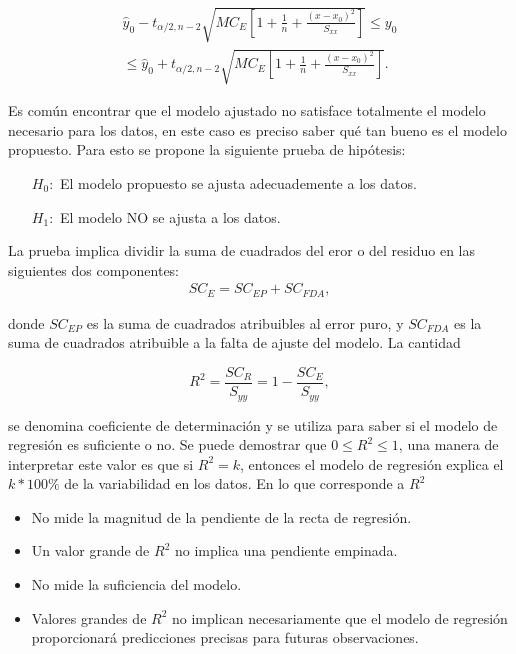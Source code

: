 \documentclass[12pt]{article}
\begin{document}
\begin{eqnarray*}
\hat{y}_{0}-t_{\alpha/2,n-2}\sqrt{MC_{E}\left[1+\frac{1}{n}+\frac{\left(x-x_{0}\right)^2}{S_{xx}}\right]}\leq y_{0}\\
\leq \hat{y}_{0}+t_{\alpha/2,n-2}\sqrt{MC_{E}\left[1+\frac{1}{n}+\frac{\left(x-x_{0}\right)^2}{S_{xx}}\right]}.
\end{eqnarray*}

Es com\'un encontrar que el modelo ajustado no satisface totalmente el modelo necesario para los datos, en este caso es preciso saber qu\'e tan bueno es el modelo propuesto. Para esto se propone la siguiente prueba de hip\'otesis:

\begin{itemize}
\item[$H_{0}:$ ]El modelo propuesto se ajusta adecuademente a los datos.
\item[$H_{1}:$ ]El modelo NO se ajusta a los datos.
\end{itemize}
La prueba implica dividir la suma de cuadrados del eror o del residuo en las siguientes dos componentes:
\begin{eqnarray*}
SC_{E}=SC_{EP}+SC_{FDA},
\end{eqnarray*}

donde $SC_{EP}$ es la suma de cuadrados atribuibles al error puro, y $SC_{FDA}$ es la suma de cuadrados atribuible a la falta de ajuste del modelo. La cantidad

\begin{equation}
R^{2}=\frac{SC_{R}}{S_{yy}}=1-\frac{SC_{E}}{S_{yy}},
\end{equation}

se denomina coeficiente de determinaci\'on y se utiliza para saber si el modelo de regresi\'on es suficiente o no. Se puede demostrar que $0\leq R^{2}\leq1$, una manera de interpretar este valor es que si $R^{2}=k$, entonces el modelo de regresi\'on explica el $k*100\%$ de la variabilidad en los datos. En lo que corresponde a  $R^{2}$ 

\begin{itemize}
\item No mide la magnitud de la pendiente de la recta de regresi\'on.
\item Un valor grande de $R^{2}$ no implica una pendiente empinada.
\item No mide la suficiencia del modelo.
\item Valores grandes de $R^{2}$ no implican necesariamente que el modelo de regresi\'on proporcionar\'a predicciones precisas para futuras observaciones.
\end{itemize}
\end{document}
